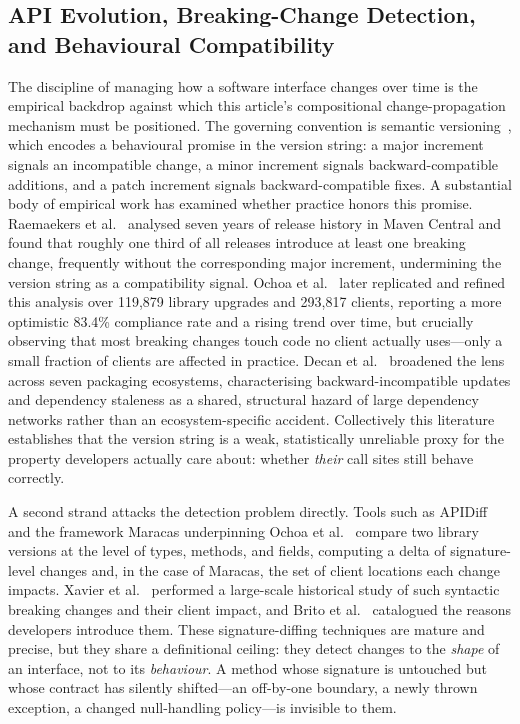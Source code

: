 \subsection{API Evolution, Breaking-Change Detection, and Behavioural Compatibility}
\label{subsec:rw7}

The discipline of managing how a software interface changes over time is the empirical backdrop against which this article's compositional change-propagation mechanism must be positioned. The governing convention is semantic versioning~\cite{preston2013semver}, which encodes a behavioural promise in the version string: a major increment signals an incompatible change, a minor increment signals backward-compatible additions, and a patch increment signals backward-compatible fixes. A substantial body of empirical work has examined whether practice honors this promise. Raemaekers et al.~\cite{raemaekers2017semver} analysed seven years of release history in Maven Central and found that roughly one third of all releases introduce at least one breaking change, frequently without the corresponding major increment, undermining the version string as a compatibility signal. Ochoa et al.~\cite{ochoa2022breaking} later replicated and refined this analysis over 119{,}879 library upgrades and 293{,}817 clients, reporting a more optimistic 83.4\% compliance rate and a rising trend over time, but crucially observing that most breaking changes touch code no client actually uses---only a small fraction of clients are affected in practice. Decan et al.~\cite{decan2019empirical} broadened the lens across seven packaging ecosystems, characterising backward-incompatible updates and dependency staleness as a shared, structural hazard of large dependency networks rather than an ecosystem-specific accident. Collectively this literature establishes that the version string is a weak, statistically unreliable proxy for the property developers actually care about: whether \emph{their} call sites still behave correctly.

A second strand attacks the detection problem directly. Tools such as APIDiff~\cite{brito2018apidiff} and the framework Maracas underpinning Ochoa et al.~\cite{ochoa2022breaking} compare two library versions at the level of types, methods, and fields, computing a delta of signature-level changes and, in the case of Maracas, the set of client locations each change impacts. Xavier et al.~\cite{xavier2017historical} performed a large-scale historical study of such syntactic breaking changes and their client impact, and Brito et al.~\cite{brito2018why} catalogued the reasons developers introduce them. These signature-diffing techniques are mature and precise, but they share a definitional ceiling: they detect changes to the \emph{shape} of an interface, not to its \emph{behaviour}. A method whose signature is untouched but whose contract has silently shifted---an off-by-one boundary, a newly thrown exception, a changed null-handling policy---is invisible to them.

